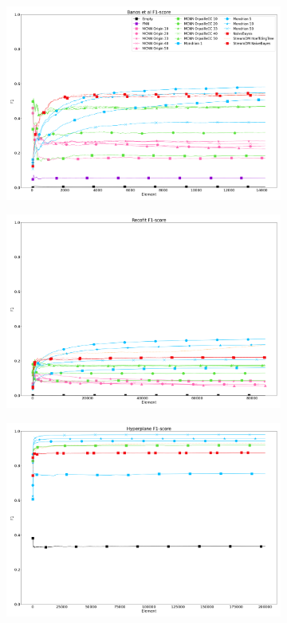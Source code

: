 \begin{figure}[ht]
	\begin{subfigure}[t]{.5\linewidth}
		\includegraphics[width=\linewidth]{figures/results/banos_3_f1.png}
		\caption{\banosdataset}
		\label{fig:f1-banos}
	\end{subfigure}
	\begin{subfigure}[t]{.5\linewidth}
		\includegraphics[width=\linewidth]{figures/results/recofit_3_f1.png}
		\caption{\recofitdataset}
		\label{fig:f1-recofit}
	\end{subfigure}
	\begin{subfigure}[t]{.5\linewidth}
		\includegraphics[width=\linewidth]{figures/results/dataset_1_f1.png}

\end{subfigure}
\end{figure}
